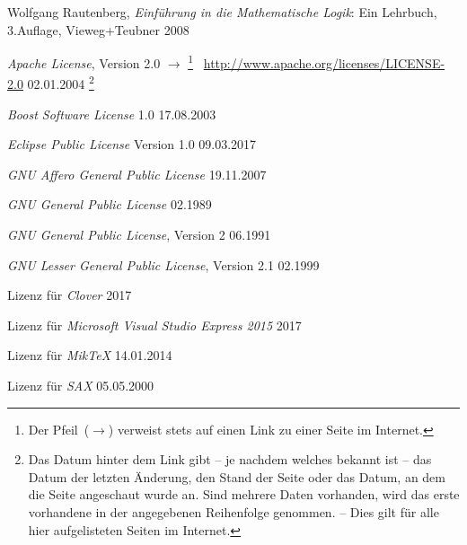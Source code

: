 \begin{flushleft}
	\begin{thebibliography}{12}
		\likechapter[section]{\bibname}  %
		\label{dic:Literaturverzeichnis} %

		Wolfgang Rautenberg,
		\emph{Einführung in die Mathematische Logik}:
		Ein Lehrbuch, 3.\@ Auflage, Vieweg+Teubner 2008

		\emph{Apache License}, Version 2.0
		$\rightarrow$%
		\footnote{%
			Der Pfeil~($\rightarrow$) verweist stets auf einen Link zu einer Seite im Internet.%
		}%
		~\url{http://www.apache.org/licenses/LICENSE-2.0}
		02.01.2004%
		\footnote{%
			Das Datum hinter dem Link gibt -- je nachdem welches bekannt ist -- das Datum der letzten Änderung, den Stand der Seite oder das Datum, an dem die Seite angeschaut wurde an.
			Sind mehrere Daten vorhanden, wird das erste vorhandene in der angegebenen Reihenfolge genommen.
			-- Dies gilt für alle hier aufgelisteten Seiten im Internet.%
		}

		\emph{Boost Software License} 1.0
		17.08.2003

		\emph{Eclipse Public License} Version 1.0
		09.03.2017

		\emph{GNU Affero General Public License}
		19.11.2007

		\emph{GNU General Public License}
		02.1989

		\emph{GNU General Public License}, Version 2
		06.1991

		\emph{GNU Lesser General Public License},
		Version 2.1
		02.1999

		Lizenz für \emph{Clover}
		2017

		Lizenz
		für \emph{Microsoft Visual Studio Express 2015}
		2017

		Lizenz für \emph{MikTeX}
		14.01.2014

		Lizenz für \emph{SAX}
		05.05.2000


\end{thebibliography}
\end{flushleft}
